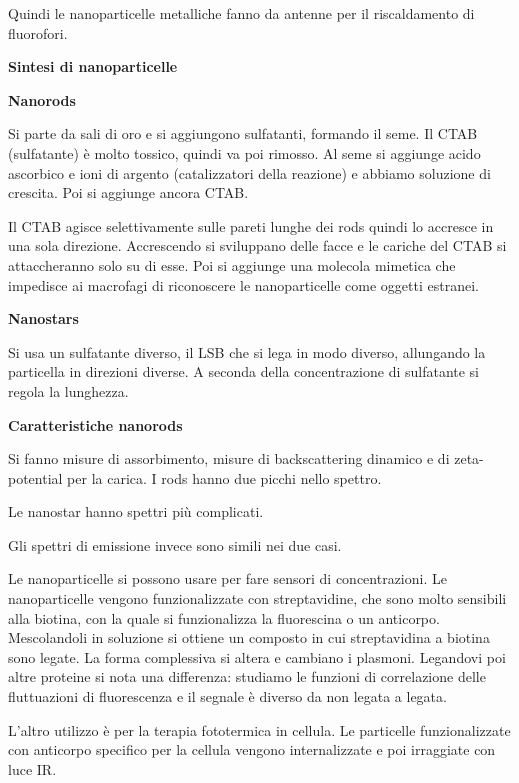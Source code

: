 Quindi le nanoparticelle metalliche fanno da antenne per il
riscaldamento di fluorofori.

\textbf{Sintesi di nanoparticelle}

\textbf{Nanorods}

Si parte da sali di oro e si aggiungono sulfatanti, formando il seme. Il
CTAB (sulfatante) è molto tossico, quindi va poi rimosso. Al seme si
aggiunge acido ascorbico e ioni di argento (catalizzatori della
reazione) e abbiamo soluzione di crescita. Poi si aggiunge ancora CTAB.

Il CTAB agisce selettivamente sulle pareti lunghe dei rods quindi lo
accresce in una sola direzione. Accrescendo si sviluppano delle facce e
le cariche del CTAB si attaccheranno solo su di esse. Poi si aggiunge
una molecola mimetica che impedisce ai macrofagi di riconoscere le
nanoparticelle come oggetti estranei.

\textbf{Nanostars}

Si usa un sulfatante diverso, il LSB che si lega in modo diverso,
allungando la particella in direzioni diverse. A seconda della
concentrazione di sulfatante si regola la lunghezza.

\textbf{Caratteristiche nanorods}

Si fanno misure di assorbimento, misure di backscattering dinamico e di
zeta-potential per la carica. I rods hanno due picchi nello spettro.

Le nanostar hanno spettri più complicati.

Gli spettri di emissione invece sono simili nei due casi.

Le nanoparticelle si possono usare per fare sensori di concentrazioni.
Le nanoparticelle vengono funzionalizzate con streptavidine, che sono
molto sensibili alla biotina, con la quale si funzionalizza la
fluorescina o un anticorpo. Mescolandoli in soluzione si ottiene un
composto in cui streptavidina a biotina sono legate. La forma
complessiva si altera e cambiano i plasmoni. Legandovi poi altre
proteine si nota una differenza: studiamo le funzioni di correlazione
delle fluttuazioni di fluorescenza e il segnale è diverso da non legata
a legata.

L'altro utilizzo è per la terapia fototermica in cellula. Le particelle
funzionalizzate con anticorpo specifico per la cellula vengono
internalizzate e poi irraggiate con luce IR.


